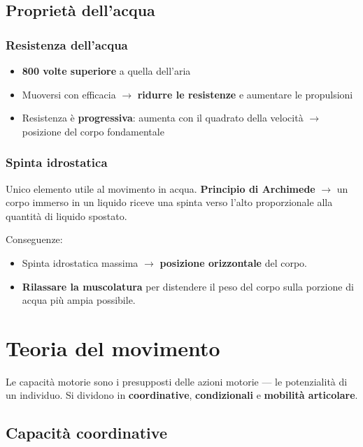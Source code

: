 \documentclass[12pt, a4paper]{article}
\begin{document}
\subsection{Proprietà dell'acqua}

\subsubsection{Resistenza dell'acqua}
\begin{itemize}
  \item \textbf{800 volte superiore} a quella dell'aria
  \item Muoversi con efficacia $\rightarrow$ \textbf{ridurre le resistenze} e aumentare le propulsioni
  \item Resistenza è \textbf{progressiva}: aumenta con il quadrato della velocità $\rightarrow$ posizione del corpo fondamentale
\end{itemize}

\subsubsection{Spinta idrostatica}

Unico elemento utile al movimento in acqua.
\textbf{Principio di Archimede} $\rightarrow$ un corpo immerso in un liquido riceve una spinta verso l'alto proporzionale alla quantità di liquido spostato.

Conseguenze:
\begin{itemize}
  \item Spinta idrostatica massima $\rightarrow$ \textbf{posizione orizzontale} del corpo.
  \item \textbf{Rilassare la muscolatura} per distendere il peso del corpo sulla porzione di acqua più ampia possibile.
\end{itemize}

\section{Teoria del movimento}

Le capacità motorie sono i presupposti delle azioni motorie --- le potenzialità di un individuo. Si dividono in \textbf{coordinative}, \textbf{condizionali} e \textbf{mobilità articolare}.

\subsection{Capacità coordinative}
\end{document}
